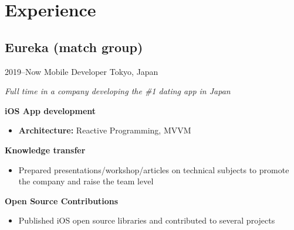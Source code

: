 \documentclass[]{template/friggeri-cv} %
\begin{document}

\section{Experience}



\subsection{Eureka (match group)}
\begin{entrylist}


\entry
{2019--Now}
{Mobile Developer}
{Tokyo, Japan}
{\emph{Full time in a company developing the \#1 dating app in Japan}

\textbf{iOS App development} 
\begin{itemize}
\item \textbf{Architecture:} Reactive Programming, MVVM
\end{itemize}

\textbf{Knowledge transfer} 
\begin{itemize}
\item Prepared presentations/workshop/articles on technical subjects to promote the company and raise the team level

\end{itemize}

\textbf{Open Source Contributions} 
\begin{itemize}
\item Published iOS open source libraries and contributed to several projects

\end{itemize}


}
\end{entrylist}
\end{document}
